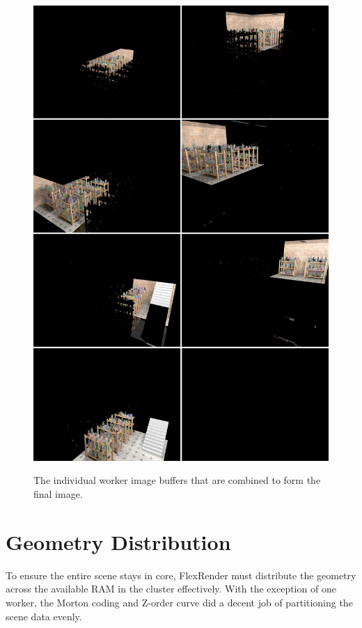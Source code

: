 \documentclass[12pt]{ucthesis}
\newcommand{\captionfonts}{\small\bf\ssp}
\begin{document}
\begin{figure}[h!]
    \centering
    \includegraphics[width=120mm]{images/toystoredistribution.png}
    \captionfonts
    \caption{The individual worker image buffers that are combined to form the final image.}
    \label{fig:toystoredist}
\end{figure}

\section{Geometry Distribution}
\label{geomdist}

To ensure the entire scene stays in core, FlexRender must distribute the
geometry across the available RAM in the cluster effectively. With the exception
of one worker, the Morton coding and Z-order curve did a decent job of
partitioning the scene data evenly.
\end{document}
